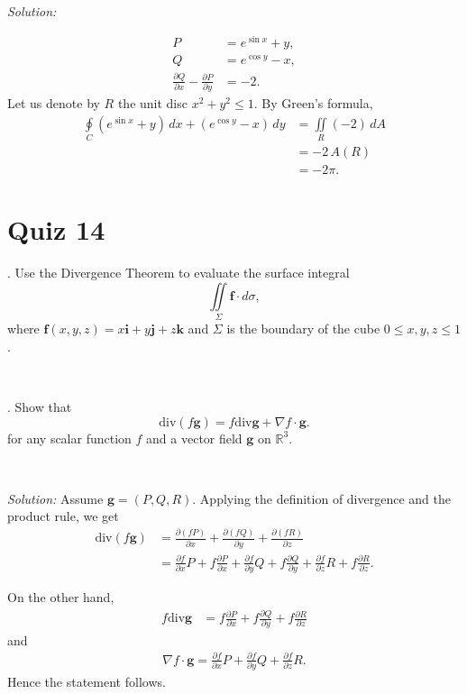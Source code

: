 \documentclass{article}
\def\RR{\mathbb{R}}%
\def\le{\leqslant}%
\begin{document}
\ 

\noindent\textit{Solution:}

\begin{align*}
P&= e^{\sin x}+y,
\\
Q&=e^{\cos y}-x,
\\
\frac{\partial Q}{\partial x}-\frac{\partial P}{\partial y}&=-2.
\end{align*}
Let us denote by $R$ the unit disc $x^2+y^2\le 1$.
By Green's formula,
\begin{align*}
\oint\limits_C (e^{\sin x}+y)\,dx+(e^{\cos y}-x)\,dy
&=
\iint\limits_R(-2)\,dA
\\
&=-2\, A(R)
\\
&=-2\pi.
\end{align*}



\section*{
Quiz 14
}

. Use the Divergence Theorem to evaluate the surface integral
\[\iint\limits_{\Sigma} \mathbf{f}\cdot d\sigma,\]
where
$\mathbf{f}(x,y,z) = x\mathbf{i} + y\mathbf{j} + z\mathbf{k}$ and
$\Sigma$ is the boundary of the cube $0 \le x,y,z \le 1$.


\



. Show that 
\[\mathrm{div}(f\mathbf{g})=f\mathrm{div}\mathbf{g}+\nabla f\cdot\mathbf{g}.
\]
for any scalar function $f$ and a vector field $\mathbf{g}$ on $\RR^3$.

\ 

\noindent\textit{Solution:}
Assume $\mathbf{g}=(P,Q,R)$.
Applying the definition of divergence and the product rule, we get
\begin{align*}
\mathrm{div}(f\mathbf{g})&=\frac{\partial (fP)}{\partial x}+\frac{\partial (fQ)}{\partial y}+\frac{\partial(fR)}{\partial z}
\\
&=\frac{\partial f}{\partial x}P+f\frac{\partial P}{\partial x}
+\frac{\partial f}{\partial y}Q+f\frac{\partial Q}{\partial y}
+\frac{\partial f}{\partial z}R+f\frac{\partial R}{\partial z}.
\end{align*}

On the other hand,
\begin{align*}
f\mathrm{div}\mathbf{g}&=f\frac{\partial P}{\partial x}
+f\frac{\partial Q}{\partial y}
+f\frac{\partial R}{\partial z}
\end{align*}
and 
\begin{align*}
\nabla f\cdot\mathbf{g}=\frac{\partial f}{\partial x}P
+\frac{\partial f}{\partial y}Q
+\frac{\partial f}{\partial z}R.
\end{align*}
Hence the statement follows.
\end{document}
